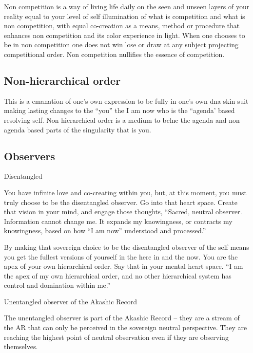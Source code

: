 Non competition is a way of living life daily on the seen and unseen
layers of your reality equal to your level of self illumination of what
is competition and what is non competition, with equal co-creation as a
means, method or procedure that enhances non competition and its color
experience in light. When one chooses to be in non competition one does
not win lose or draw at any subject projecting competitional order. Non
competition nullifies the essence of competition.

\subsection{Non-hierarchical order}\label{non-hierarchical-order}

This is a emanation of one's own expression to be fully in one's own dna
skin suit making lasting changes to the ``you'' the I am now who is the
``agenda' based resolving self. Non hierarchical order is a medium to
belne the agenda and non agenda based parts of the singularity that is
you.

\subsection{Observers}\label{observers}

Disentangled

You have infinite love and co-creating within you, but, at this moment,
you must truly choose to be the disentangled observer. Go into that
heart space. Create that vision in your mind, and engage those thoughts,
``Sacred, neutral observer. Information cannot change me. It expands my
knowingness, or contracts my knowingness, based on how ``I am now''
understood and processed.''

By making that sovereign choice to be the disentangled observer of the
self means you get the fullest versions of yourself in the here in and
the now. You are the apex of your own hierarchical order. Say that in
your mental heart space. ``I am the apex of my own hierarchical order,
and no other hierarchical system has control and domination within me.''

Unentangled observer of the Akashic Record

The unentangled observer is part of the Akashic Record -- they are a
stream of the AR that can only be perceived in the sovereign neutral
perspective. They are reaching the highest point of neutral observation
even if they are observing themselves.

